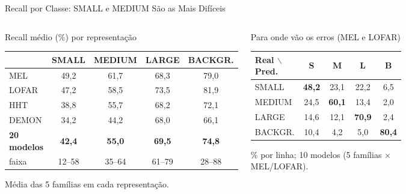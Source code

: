 \documentclass[aspectratio=169]{beamer}
\begin{document}
\begin{frame}{Recall por Classe: SMALL e MEDIUM São as Mais Difíceis}
    \footnotesize
    \begin{columns}[t]
        \begin{block}{\small Recall médio (\%) por representação}
            \scriptsize
            \centering
            \setlength{\tabcolsep}{4pt}
            \begin{tabular}{lcccc}
            \toprule
             & SMALL & MEDIUM & LARGE & BACKGR. \\
            \midrule
            MEL   & 49,2 & 61,7 & 68,3 & 79,0 \\
            LOFAR & 47,2 & 58,5 & 73,5 & 81,9 \\
            HHT   & 38,8 & 55,7 & 68,2 & 72,1 \\
            DEMON & 34,2 & 44,2 & 68,0 & 66,1 \\
            \midrule
            \textbf{20 modelos} & \textbf{42,4} & \textbf{55,0} & \textbf{69,5} & \textbf{74,8} \\
            faixa & 12--58 & 35--64 & 61--79 & 28--88 \\
            \bottomrule
            \end{tabular}

            \vspace{0.05cm}
            {\tiny Média das 5 famílias em cada representação.\par}
        \end{block}

        \begin{block}{\small Para onde vão os erros (MEL e LOFAR)}
            \scriptsize
            \centering
            \begin{tabular}{lcccc}
            \toprule
            Real $\backslash$ Pred. & S & M & L & B \\
            \midrule
            SMALL  & \textbf{48,2} & 23,1 & 22,2 & 6,5 \\
            MEDIUM & 24,5 & \textbf{60,1} & 13,4 & 2,0 \\
            LARGE  & 14,6 & 12,1 & \textbf{70,9} & 2,4 \\
            BACKGR. & 10,4 & 4,2 & 5,0 & \textbf{80,4} \\
            \bottomrule
            \end{tabular}

            \vspace{0.05cm}
            {\tiny \% por linha; 10 modelos (5 famílias $\times$ MEL/LOFAR).\par}
        \end{block}
    \end{columns}


\end{frame}
\end{document}
